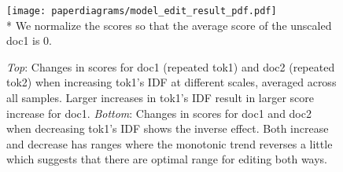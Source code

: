\begin{figure}[!ht]
    \centering
    \texttt{[image: paperdiagrams/model\_edit\_result\_pdf.pdf]}
    \footnotesize{\\ * We normalize the scores so that the average score of the unscaled doc1 is 0.}
    \caption{\textit{Top}: Changes in scores for doc1 (repeated tok1) and doc2 (repeated tok2) when increasing tok1's IDF at different scales, averaged across all samples. Larger increases in tok1's IDF result in larger score increase for doc1.  \textit{Bottom}: Changes in scores for doc1 and doc2 when decreasing tok1's IDF shows the inverse effect. Both increase and decrease has ranges where the monotonic trend reverses a little which suggests that there are optimal range for editing both ways.}
    \label{fig:model_edit_result}
    \vspace{-1em}
\end{figure}
